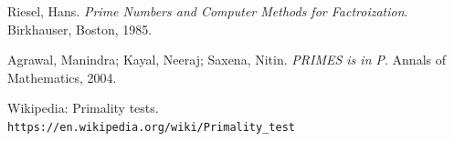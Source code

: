 \documentclass[11pt]{article}
\begin{document}
\begin{thebibliography}{9}
Riesel, Hans. 
\textit{Prime Numbers and Computer Methods for Factroization}. Birkhauser, Boston, 1985.
 
Agrawal, Manindra; Kayal, Neeraj; Saxena, Nitin. \textit{PRIMES is in P}. Annals of Mathematics, 2004.

 
Wikipedia: Primality tests.
\\\texttt{https://en.wikipedia.org/wiki/Primality\_test}
\end{thebibliography}
\end{document}
